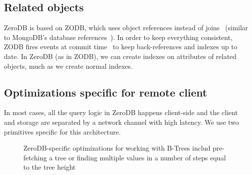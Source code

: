 \documentclass[notitlepage,longbibliography]{revtex4-1}
\begin{document}
\subsection{Related objects}

ZeroDB is based on ZODB, which uses object references instead of joins~\cite{zodb-references}
(similar to MongoDB's database references~\cite{mongo-db-references}).
In order to keep everything consistent, ZODB fires events at commit time~\cite{zope-events} to keep back-references and indexes up to date.
In ZeroDB (as in ZODB), we can create indexes on attributes of related objects, much as we create normal indexes.

\subsection{Optimizations specific for remote client}

In most cases, all the query logic in ZeroDB happens client-side and the client and storage are separated by a network channel with high latency.
We use two primitives specific for this architecture.

\begin{figure}
	\begin{center}
        \qquad
	\end{center}
    \caption{ZeroDB-specific optimizations for working with B-Trees includ pre-fetching a tree or finding multiple values in a number of steps equal to the tree height}
	\label{fig:tree-traversal-optimizations}
\end{figure}
\end{document}
